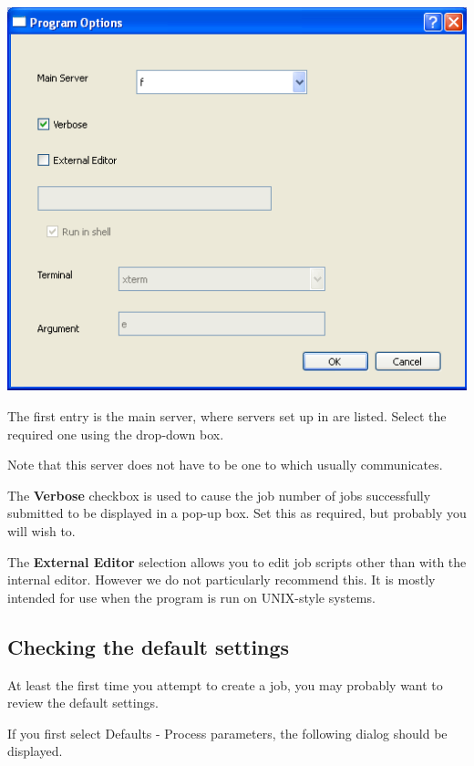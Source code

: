 \includegraphics{img/btrwpoptsdlg.png}

The first entry is the main server, where servers set up in 
are listed. Select the required one using the drop-down box.

Note that this server does not have to be one to which  usually
communicates.

The \textbf{Verbose} checkbox is used to cause the job number of jobs successfully
submitted to be displayed in a pop-up box. Set this as required, but probably
you will wish to.

The \textbf{External Editor} selection allows you to edit job scripts other than
with the internal editor. However we do not particularly recommend this. It is
mostly intended for use when the program is run on UNIX-style systems.

\subsection{Checking the default settings}

At least the first time you attempt to create a job, you may probably want
to review the default settings.

If you first select {Defaults - Process parameters}, the following dialog should be
displayed.

